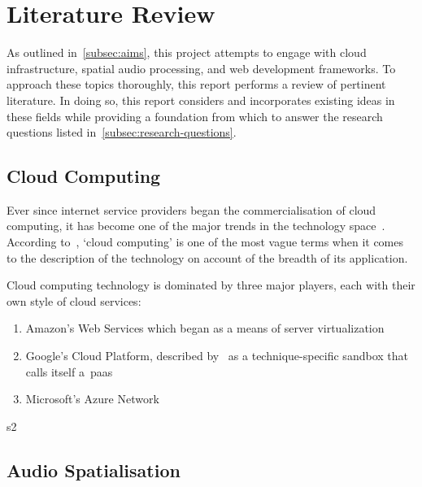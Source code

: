 
\thispagestyle{plain}
\newpage
\section{Literature Review}\label{sec:literature-review}

\normalsize

As outlined in~\ref{subsec:aims}, this project attempts to engage with cloud infrastructure, spatial audio processing, and web development frameworks.
To approach these topics thoroughly, this report performs a review of pertinent literature.
In doing so, this report considers and incorporates existing ideas in these fields while providing a foundation from which to answer the research questions listed in~\ref{subsec:research-questions}.

\subsection{Cloud Computing}\label{subsec:cloud-computing}

Ever since internet service providers began the commercialisation of cloud computing, it has become one of the major trends in the technology space~\citep{cc_overview}.
According to~\citet{cc_overview}, `cloud computing' is one of the most vague terms when it comes to the description of the technology on account of the breadth of its application.

Cloud computing technology is dominated by three major players, each with their own style of cloud services:
\begin{enumerate}
    \item Amazon's Web Services which began as a means of server virtualization~\citep{awsintro}
    \item Google's Cloud Platform, described by~\citet{cc_overview} as a technique-specific sandbox that calls itself a~\gls{paas}~\citep{googlecloudintro}
    \item Microsoft's Azure Network~\citep{azurefundamentals}
\end{enumerate}


s2\citep{cc_challenges}

\subsection{Audio Spatialisation}\label{subsec:audio-spatialisation}

